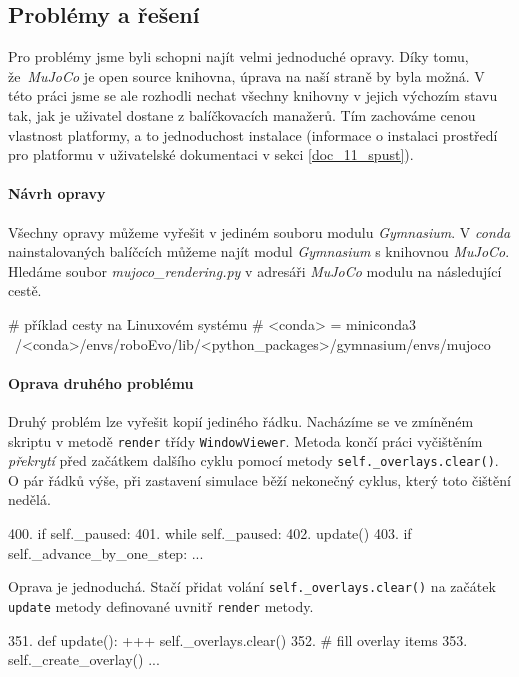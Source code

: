 \subsection{Problémy a řešení}
Pro problémy jsme byli schopni najít velmi jednoduché opravy. Díky tomu,
že~\emph{MuJoCo} je open source knihovna, úprava na naší straně by byla možná.
V této práci jsme se ale rozhodli nechat všechny knihovny v jejich výchozím
stavu tak, jak je uživatel dostane z balíčkovacích manažerů. Tím zachováme
cenou vlastnost platformy, a to jednoduchost instalace (informace o instalaci
prostředí pro platformu v uživatelské dokumentaci v sekci \ref{doc_11_spust}).

\paragraph{Návrh opravy}
Všechny opravy můžeme vyřešit v jediném souboru modulu \emph{Gymnasium}.
V \emph{conda} nainstalovaných balíčcích můžeme najít modul \emph{Gymnasium} s
knihovnou \emph{MuJoCo}. Hledáme soubor \emph{mujoco\_rendering.py} v adresáři
\emph{MuJoCo} modulu na následující cestě. 
\begin{code}
# příklad cesty na Linuxovém systému
# <conda> = miniconda3
~/<conda>/envs/roboEvo/lib/<python_packages>/gymnasium/envs/mujoco
\end{code}

\paragraph{Oprava druhého problému}
Druhý problém lze vyřešit kopií jediného řádku. Nacházíme se ve
zmíněném skriptu v metodě \texttt{render} třídy \texttt{WindowViewer}. Metoda
končí práci vyčištěním \emph{překrytí} před začátkem dalšího cyklu pomocí
metody \texttt{self.\_overlays.clear()}. O pár řádků výše, při zastavení
simulace běží nekonečný cyklus, který toto čištění nedělá. 
\begin{code}
400.  if self._paused:                       
401.      while self._paused:                
402.          update()                      
403.          if self._advance_by_one_step:
...
\end{code}
Oprava je jednoduchá. Stačí přidat volání \texttt{self.\_overlays.clear()} na
začátek \texttt{update} metody definované uvnitř \texttt{render} metody.
\begin{code}
351.  def update():
+++       self._overlays.clear()
352.      # fill overlay items
353.      self._create_overlay()
...
\end{code}

